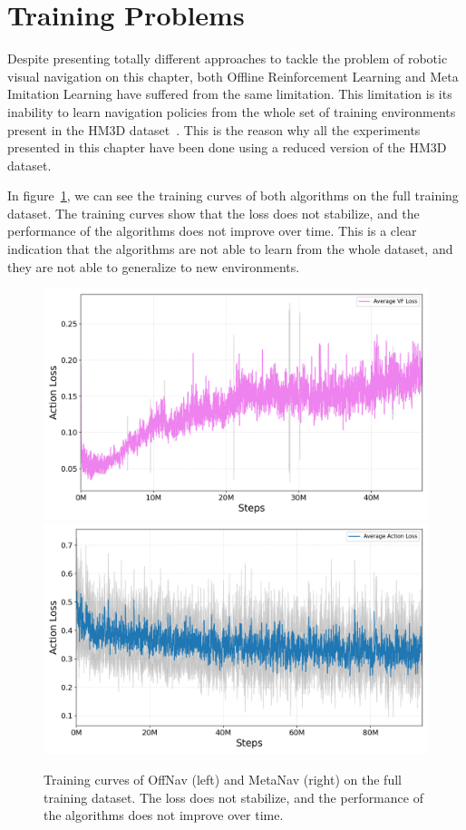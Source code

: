 \section{Training Problems}\label{sec:training-problems}

Despite presenting totally different approaches to tackle the problem of robotic visual navigation on this chapter, both Offline Reinforcement Learning and Meta Imitation Learning have suffered from the same limitation.
This limitation is its inability to learn navigation policies from the whole set of training environments present in the HM3D dataset~\cite{Ramakrishnan2021HabitatMatterport3D}.
This is the reason why all the experiments presented in this chapter have been done using a reduced version of the HM3D dataset.

In figure~\ref{fig:training_problems}, we can see the training curves of both algorithms on the full training dataset.
The training curves show that the loss does not stabilize, and the performance of the algorithms does not improve over time.
This is a clear indication that the algorithms are not able to learn from the whole dataset, and they are not able to generalize to new environments.

\begin{figure}
    \centering
    \includegraphics[width=0.49\linewidth]{figures/offnav/offnav_losses_avg_std}
    \includegraphics[width=0.49\linewidth]{figures/metanav/metanav_losses_avg_std}
    \caption{Training curves of OffNav (left) and MetaNav (right) on the full training dataset. The loss does not stabilize, and the performance of the algorithms does not improve over time.}
    \label{fig:training_problems}
\end{figure}

